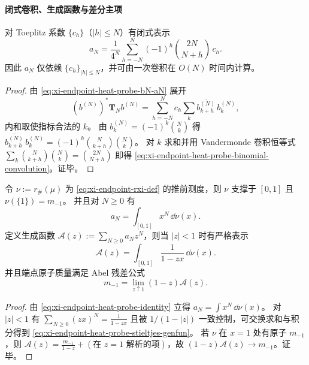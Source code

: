 \paragraph{闭式卷积、生成函数与差分主项}
\begin{proposition}\label{prop:xi-endpoint-heat-probe-binomial-convolution}
对 Toeplitz 系数 \(\{c_h\}\)（\(|h|\le N\)）有闭式表示
\begin{equation}\label{eq:xi-endpoint-heat-probe-binomial-convolution}
\boxed{\;
a_N=\frac{1}{4^N}\sum_{h=-N}^{N}(-1)^h\binom{2N}{N+h}\,c_h.\;}
\end{equation}
因此 \(a_N\) 仅依赖 \(\{c_h\}_{|h|\le N}\)，并可由一次卷积在 \(O(N)\) 时间内计算。
\end{proposition}
\begin{proof}
由 \eqref{eq:xi-endpoint-heat-probe-bN-aN} 展开
\[
(b^{(N)})^\ast\mathbf{T}_N b^{(N)}
=\sum_{h=-N}^{N}c_h\sum_{k} \overline{b^{(N)}_{k+h}}\,b^{(N)}_{k},
\]
内和取使指标合法的 \(k\)。
由 \(b^{(N)}_{k}=(-1)^k\binom{N}{k}\) 得
\(
\overline{b^{(N)}_{k+h}}\,b^{(N)}_{k}=(-1)^h\binom{N}{k+h}\binom{N}{k}
\)。
对 \(k\) 求和并用 Vandermonde 卷积恒等式
\(
\sum_k\binom{N}{k+h}\binom{N}{k}=\binom{2N}{N+h}
\)
即得 \eqref{eq:xi-endpoint-heat-probe-binomial-convolution}。证毕。
\end{proof}

\begin{proposition}\label{prop:xi-endpoint-heat-probe-stieltjes-abel-residue}
令 \(\nu:=r_\#(\mu)\) 为 \eqref{eq:xi-endpoint-rxi-def} 的推前测度，则 \(\nu\) 支撑于 \([0,1]\) 且 \(\nu(\{1\})=m_{-1}\)。
并且对 \(N\ge 0\) 有
\[
a_N=\int_{[0,1]}x^N\,\dd\nu(x).
\]
定义生成函数
\(
\mathcal{A}(z):=\sum_{N\ge 0}a_N z^N
\)，则当 \(|z|<1\) 时有严格表示
\begin{equation}\label{eq:xi-endpoint-heat-probe-stieltjes-genfun}
\boxed{\;
\mathcal{A}(z)=\int_{[0,1]}\frac{1}{1-zx}\,\dd\nu(x).\;}
\end{equation}
并且端点原子质量满足 Abel 残差公式
\begin{equation}\label{eq:xi-endpoint-heat-probe-abel-residue}
\boxed{\;m_{-1}=\lim_{z\uparrow 1}(1-z)\mathcal{A}(z).\;}
\end{equation}
\end{proposition}
\begin{proof}
由 \eqref{eq:xi-endpoint-heat-probe-identity} 立得 \(a_N=\int x^N\,\dd\nu(x)\)。
对 \(|z|<1\) 有 \(\sum_{N\ge 0}(zx)^N=\frac{1}{1-zx}\) 且被 \(1/(1-|z|)\) 一致控制，可交换求和与积分得到 \eqref{eq:xi-endpoint-heat-probe-stieltjes-genfun}。
若 \(\nu\) 在 \(x=1\) 处有原子 \(m_{-1}\)，则 \(\mathcal{A}(z)=\frac{m_{-1}}{1-z}+(\text{在 }z=1\text{ 解析的项})\)，故 \((1-z)\mathcal{A}(z)\to m_{-1}\)。证毕。
\end{proof}

